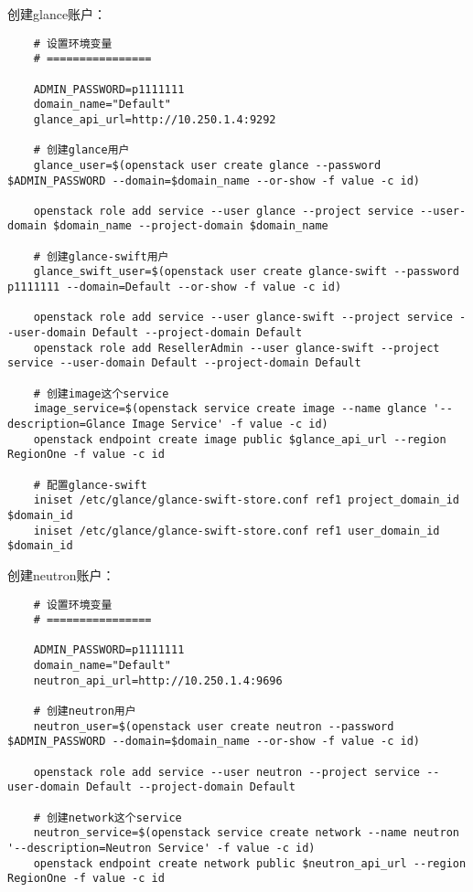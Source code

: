 \documentclass[a4paper,left=1.5cm,right=1.5cm,11pt]{article}
\begin{document}
	创建glance账户：
	\begin{lstlisting}
	# 设置环境变量
	# ================

	ADMIN_PASSWORD=p1111111
	domain_name="Default"
	glance_api_url=http://10.250.1.4:9292

	# 创建glance用户
	glance_user=$(openstack user create glance --password $ADMIN_PASSWORD --domain=$domain_name --or-show -f value -c id)
	
	openstack role add service --user glance --project service --user-domain $domain_name --project-domain $domain_name
	
	# 创建glance-swift用户
	glance_swift_user=$(openstack user create glance-swift --password p1111111 --domain=Default --or-show -f value -c id)
	
	openstack role add service --user glance-swift --project service --user-domain Default --project-domain Default
	openstack role add ResellerAdmin --user glance-swift --project service --user-domain Default --project-domain Default
	
	# 创建image这个service
	image_service=$(openstack service create image --name glance '--description=Glance Image Service' -f value -c id)
	openstack endpoint create image public $glance_api_url --region RegionOne -f value -c id

	# 配置glance-swift
	iniset /etc/glance/glance-swift-store.conf ref1 project_domain_id $domain_id
	iniset /etc/glance/glance-swift-store.conf ref1 user_domain_id $domain_id
	\end{lstlisting}

	创建neutron账户：
	\begin{lstlisting}
	# 设置环境变量
	# ================

	ADMIN_PASSWORD=p1111111
	domain_name="Default"
	neutron_api_url=http://10.250.1.4:9696

	# 创建neutron用户
	neutron_user=$(openstack user create neutron --password $ADMIN_PASSWORD --domain=$domain_name --or-show -f value -c id)

	openstack role add service --user neutron --project service --user-domain Default --project-domain Default

	# 创建network这个service
	neutron_service=$(openstack service create network --name neutron '--description=Neutron Service' -f value -c id)
	openstack endpoint create network public $neutron_api_url --region RegionOne -f value -c id
	\end{lstlisting}
\end{document}

